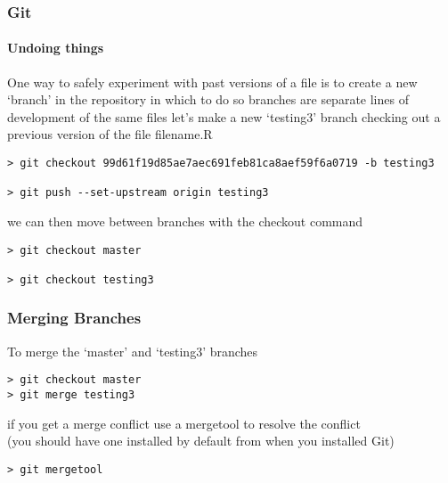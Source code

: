 \documentclass[xcolor=dvipsnames]{beamer}
\begin{document}
\begin{frame}[fragile]
\frametitle{Git}
\framesubtitle{Undoing things}
One way to safely experiment with past versions of a file is to create a new `branch' in the repository in which to do so
\newline
\newline
branches are separate lines of development of the same files
\newline
\newline
let's make a new `testing3' branch checking out a previous version of the file filename.R\\
\begin{lstlisting}
> git checkout 99d61f19d85ae7aec691feb81ca8aef59f6a0719 -b testing3

> git push --set-upstream origin testing3
\end{lstlisting}
we can then move between branches with the checkout command
\begin{lstlisting}
> git checkout master

> git checkout testing3
\end{lstlisting}
\end{frame}

\begin{frame}[fragile]
  \frametitle{Merging Branches}
To merge the `master' and `testing3' branches
\begin{block}{}
\begin{lstlisting}
> git checkout master
> git merge testing3
\end{lstlisting}
\end{block}

if you get a merge conflict use a mergetool to resolve the conflict\\
(you should have one installed by default from when you installed Git)

\begin{block}{}
\begin{lstlisting}
> git mergetool
\end{lstlisting}
\end{block}
\end{frame}

%
\end{document}
